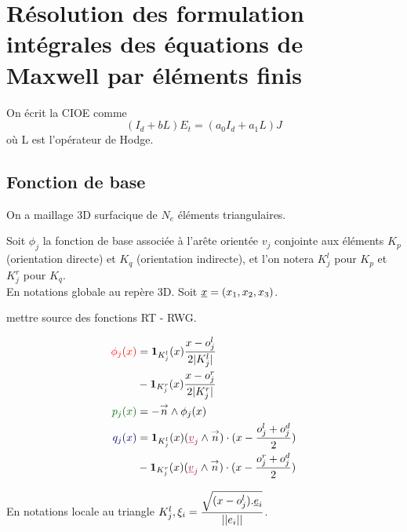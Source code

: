 \section{Résolution des formulation intégrales des équations de Maxwell par éléments finis}
On écrit la CIOE comme
\[
  (I_d + bL)E_t = (a_0I_d+a_1L)J
\]
où L est l'opérateur de Hodge.
\subsection{Fonction de base}
On a maillage 3D surfacique de \(N_e\) éléments triangulaires.

Soit \(\phi_j\) la fonction de base associée à l’arête orientée \(v_j\) conjointe aux éléments \(K_p\) (orientation directe) et \(K_q\) (orientation indirecte), et l'on notera \(K_j^l\) pour \(K_p\) et \(K_j^r\) pour \(K_q\).\\

En notations globale au repère 3D. 
Soit \(\v x = (x_1,x_2,x_3)\).

\begin{TODO}
  mettre source des fonctions RT - RWG.
\end{TODO}

\begin{minipage}{0.4\textwidth}
\begin{align*}
	\color{red}{\phi_j(x)} &= \mathbf{1}_{K_j^l}(x)\frac{x-o_j^l}{2|K_j^l|} \\&- \mathbf{1}_{K_j^r}(x)\frac{x-o_j^r}{2|K_j^r|}\\
	\color{black!60!green}{p_j(x)} &= -\vn \pvect \phi_j(x)\\
	\color{black!60!blue}{q_j(x)} &= \mathbf{1}_{K_j^l}(x) ( { \color{purple}{\v v_j } } \pvect \vn ) \cdot ( x - \frac{o^l_j + o^d_j}{2} ) \\
 &- \mathbf{1}_{K_j^r}(x) ( { \color{purple}{\v v_j } } \pvect \vn ) \cdot ( x - \frac{o^r_j + o^d_j}{2} )
\end{align*}
\end{minipage}
\begin{minipage}{0.58\textwidth}
	\centering
	\begin{tikzpicture}[scale=2.5]
	
	\end{tikzpicture}
\end{minipage} 

En notations locale au triangle \(K_j^l, \xi_i = \frac{\sqrt{(x-o^l_j).\v e_i}}{||e_i||}\).

